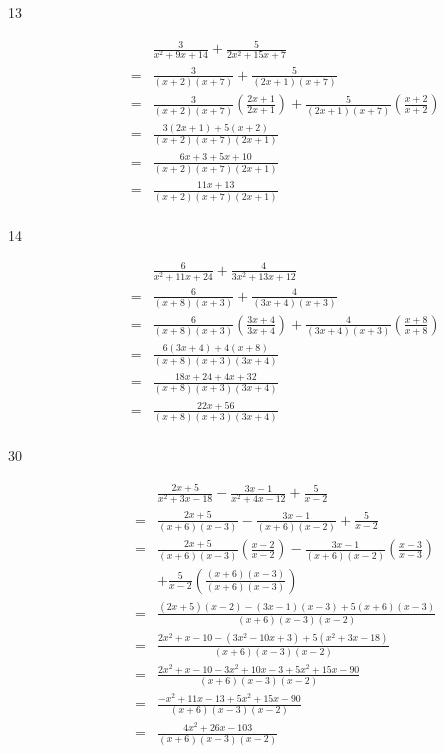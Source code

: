 \documentclass[fleqn,addpoints]{exam}
\begin{document}
\begin{description}
\item[13]
\begin{eqnarray*}
  && \frac{3}{x^2+9x+14} + \frac{5}{2x^2+15x+7} \\
  &=& \frac{3}{(x+2)(x+7)} + \frac{5}{(2x+1)(x+7)} \\
  &=& \frac{3}{(x+2)(x+7)} \left( \frac{2x+1}{2x+1} \right) + \frac{5}{(2x+1)(x+7)} \left( \frac{x+2}{x+2} \right) \\
  &=& \frac{3(2x+1) + 5(x+2)}{(x+2)(x+7)(2x+1)} \\
  &=& \frac{6x+3 + 5x+10}{(x+2)(x+7)(2x+1)} \\
  &=& \frac{11x+13}{(x+2)(x+7)(2x+1)} \\
\end{eqnarray*}

\item[14]
\begin{eqnarray*}
  && \frac{6}{x^2+11x+24} + \frac{4}{3x^2+13x+12} \\
  &=& \frac{6}{(x+8)(x+3)} + \frac{4}{(3x+4)(x+3)} \\
  &=& \frac{6}{(x+8)(x+3)} \left(\frac{3x+4}{3x+4}\right) + \frac{4}{(3x+4)(x+3)} \left(\frac{x+8}{x+8}\right) \\
  &=& \frac{6(3x+4) + 4(x+8)}{(x+8)(x+3)(3x+4)} \\
  &=& \frac{18x+24+4x+32}{(x+8)(x+3)(3x+4)} \\
  &=& \frac{22x+56}{(x+8)(x+3)(3x+4)} \\
\end{eqnarray*}

\item[30]
\begin{eqnarray*}
  &&\frac{2x+5}{x^2+3x-18} - \frac{3x-1}{x^2+4x-12} + \frac{5}{x-2} \\
  &=& \frac{2x+5}{(x+6)(x-3)} - \frac{3x-1}{(x+6)(x-2)} + \frac{5}{x-2} \\
  &=& \frac{2x+5}{(x+6)(x-3)} \left( \frac{x-2}{x-2} \right) - \frac{3x-1}{(x+6)(x-2)} \left( \frac{x-3}{x-3} \right) \\
  && + \frac{5}{x-2} \left( \frac{(x+6)(x-3)}{(x+6)(x-3)} \right) \\
  &=& \frac{(2x+5)(x-2) - (3x-1)(x-3) + 5(x+6)(x-3)}{(x+6)(x-3)(x-2)} \\
  &=& \frac{2x^2+x-10 - (3x^2-10x+3) + 5(x^2+3x-18)}{(x+6)(x-3)(x-2)} \\
  &=& \frac{2x^2+x-10 - 3x^2 +10x -3 + 5x^2+15x-90}{(x+6)(x-3)(x-2)} \\
  &=& \frac{-x^2+11x-13 + 5x^2+15x-90}{(x+6)(x-3)(x-2)} \\
  &=& \frac{4x^2+26x-103}{(x+6)(x-3)(x-2)} \\
\end{eqnarray*}


\end{description}
\end{document}

